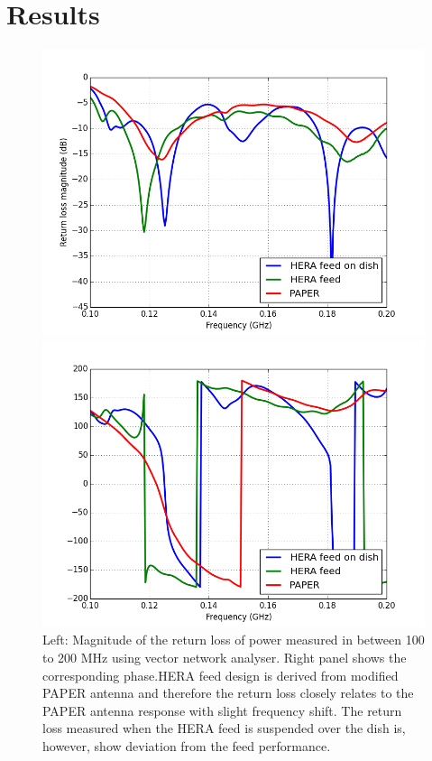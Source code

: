 \documentclass[twocolumn]{emulateapj}
\begin{document}
\section{Results}
\begin{figure}[ht]
\begin{minipage}[b]{0.5\linewidth}
\centering
\includegraphics[angle=0, width=\linewidth]{plots/s11_HERA_feed_PAPER_mag.png}
\end{minipage}
\hspace{0.1cm}
\begin{minipage}[b]{0.5\linewidth}
\centering
\includegraphics[angle=0, width=\linewidth]{plots/s11_HERA_feed_PAPER_ph.png}
\end{minipage}
\caption{Left: Magnitude of the return loss of power measured in between 100 to 200 MHz using vector network analyser. Right panel shows the corresponding phase.HERA feed design is derived from modified PAPER antenna and therefore the return loss closely relates to the PAPER antenna response with slight frequency shift. The return loss measured when the HERA feed is suspended over the dish is, however, show deviation from the feed performance. }
\label{fig:freq}       
\end{figure}
\end{document}

